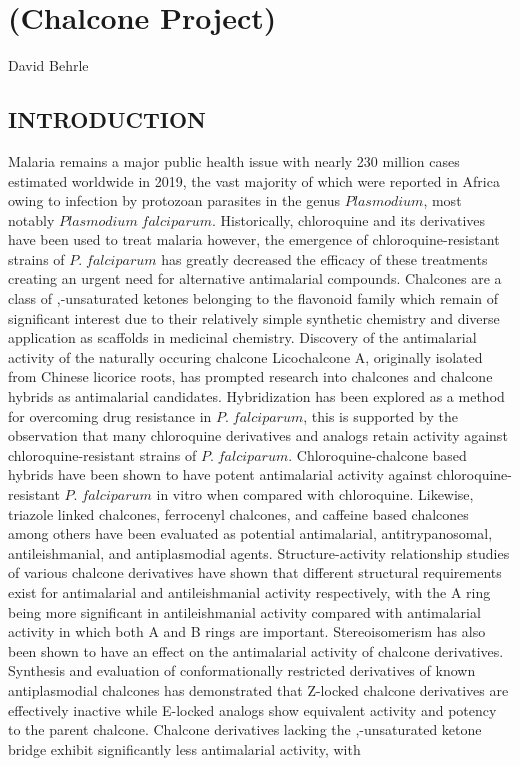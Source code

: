 \documentclass[12pt]{article}
\begin{document}
\linespread{1.25}
\raggedright
\setlength{\parskip}{6pt}
\def\citenumfont{\textit}
\renewcommand{\bibsection}{}

\section*{(Chalcone Project)}

David Behrle

\subsection*{INTRODUCTION}
Malaria remains a major public health issue with nearly 230 million cases estimated worldwide in 2019, the vast majority of which were reported in Africa owing to infection by protozoan parasites in the genus $Plasmodium$, most notably $Plasmodium\; falciparum$.\cite{Fikadu2023} Historically, chloroquine and its derivatives have been used to treat malaria however, the emergence of chloroquine-resistant strains of $P.\; falciparum$ has greatly decreased the efficacy of these treatments creating an urgent need for alternative antimalarial compounds.\cite{Fikadu2023,Yadav2012} Chalcones are a class of \textalpha,\textbeta-unsaturated ketones belonging to the flavonoid family which remain of significant interest due to their relatively simple synthetic chemistry and diverse application as scaffolds in medicinal chemistry.\cite{Qin2020} Discovery of the antimalarial activity of the naturally occuring chalcone Licochalcone A, originally isolated from Chinese licorice roots, has prompted research into chalcones and chalcone hybrids as antimalarial candidates.\cite{Cheng2020,Chen1994} Hybridization has been explored as a method for overcoming drug resistance in $P.\; falciparum$, this is supported by the observation that many chloroquine derivatives and analogs retain activity against chloroquine-resistant strains of $P.\; falciparum$.\cite{Cheng2020,Sashidhara2012} Chloroquine-chalcone based hybrids have been shown to have potent antimalarial activity against chloroquine-resistant $P.\; falciparum$ in vitro when compared with chloroquine.\cite{Sashidhara2012} Likewise, triazole linked chalcones, ferrocenyl chalcones, and caffeine based chalcones among others have been evaluated as potential antimalarial, antitrypanosomal, antileishmanial, and antiplasmodial agents.\cite{Qin2020,Singh2017,Insuasty2015} Structure-activity relationship studies of various chalcone derivatives have shown that different structural requirements exist for antimalarial and antileishmanial activity respectively, with the A ring being more significant in antileishmanial activity compared with antimalarial activity in which both A and B rings are important.\cite{Liu2003} Stereoisomerism has also been shown to have an effect on the antimalarial activity of chalcone derivatives. Synthesis and evaluation of conformationally restricted derivatives of known antiplasmodial chalcones has demonstrated that Z-locked chalcone derivatives are effectively inactive while E-locked analogs show equivalent activity and potency to the parent chalcone.\cite{Larsen2005} Chalcone derivatives lacking the \textalpha,\textbeta-unsaturated ketone bridge exhibit significantly less antimalarial activity, with 
\end{document}
